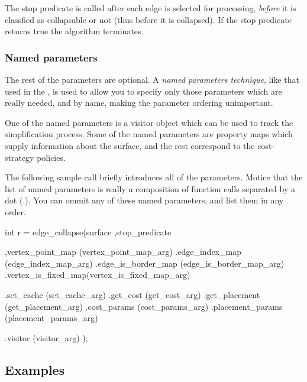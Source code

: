 The stop predicate is called after each edge is selected for processing, {\em before} it is classfied as collapsable or not (thus before it is collapsed). If the stop predicate returns true the algorithm terminates.

\subsubsection{Named parameters}

The rest of the parameters are optional. 
A {\em named parameters technique}, like that used in the 
,
is used to allow you to specify only those parameters which are really needed,
and by name, making the parameter ordering unimportant. 

One of the named parameters is a visitor object which can be used to track the simplification process. Some of the named parameters are property maps which supply information about the surface,
and the rest correspond to the cost-strategy policies. 

The following sample call briefly introduces all of the parameters.
Motice that the list of named parameters is really a composition
of function calls separated by a dot ($.$). You can ommit any of these named parameters, and list them in any order.

\begin{cprog}
int r = edge_collapse(surface
                     ,stop_predicate
                     
                     ,vertex_point_map   (vertex_point_map_arg)
                     .edge_index_map     (edge_index_map_arg)
                     .edge_is_border_map (edge_is_border_map_arg)
                     .vertex_is_fixed_map(vertex_is_fixed_map_arg)
                     
                     .set_cache          (set_cache_arg)
                     .get_cost           (get_cost_arg)
                     .get_placement      (get_placement_arg)
                     .cost_params        (cost_params_arg)
                     .placement_params   (placement_params_arg)
                     
                     .visitor            (visitor_arg)
                     );
\end{cprog}

\subsection{Examples}

